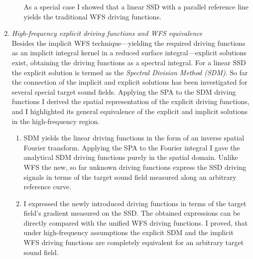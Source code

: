 \documentclass[a4paper,10pt]{article}
\begin{document}
\begin{enumerate}
\begin{enumerate}
As a special case I showed that a linear SSD with a parallel reference line yields the traditional WFS driving functions.
\end{enumerate}
%
\item \emph{High-frequency explicit driving functions and WFS equivalence}\\
Besides the implicit WFS technique---yielding the required driving functions as an implicit integral kernel in a reduced surface integral---explicit solutions exist, obtaining the driving functions as a spectral integral.
For a linear SSD the explicit solution is termed as the \emph{Spectral Division Method (SDM)}.
So far the connection of the implicit and explicit solutions has been investigated for several special target sound fields.
Applying the SPA to the SDM driving functions I derived the spatial representation of the explicit driving functions, and I highlighted its general equivalence of the explicit and implicit solutions in the high-frequency region.
\begin{enumerate}
\item SDM yields the linear driving functions in the form of an inverse spatial Fourier transform.
Applying the SPA to the Fourier integral I gave the analytical SDM driving functions purely in the spatial domain.
Unlike WFS the new, so far unknown driving functions express the SSD driving signals in terms of the target sound field measured along an arbitrary reference curve.
\item I expressed the newly introduced driving functions in terms of the target field's gradient measured on the SSD.
The obtained expressions can be directly compared with the unified WFS driving functions.
I proved, that under high-frequency assumptions the explicit SDM and the implicit WFS driving functions are completely equivalent for an arbitrary target sound field.
\end{enumerate}


\end{enumerate}
\end{document}
